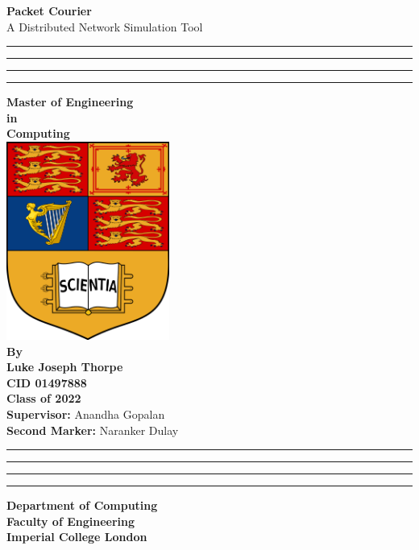 \thispagestyle{empty}
\begin{center}
    \textbf{\Huge Packet Courier}\\
    A Distributed Network Simulation Tool
    \vspace{1cm}
    \hrule\hrule\hrule\hrule
    \vspace{1cm}
    \textbf{Master of Engineering\\
    in\\
    Computing\\
    \vspace{1cm}
    \includegraphics[width=0.4\textwidth]{images/cover/icl_crest}
    \vspace{1cm}
    \\
    By\\
    Luke Joseph Thorpe\\
    CID 01497888\\
    Class of 2022}\\
    \vspace{0.5cm}
    \textbf{Supervisor:} Anandha Gopalan\\
    \textbf{Second Marker:} Naranker Dulay\\
    \vspace{1cm}
    \hrule\hrule\hrule\hrule
    \textbf{Department of Computing\\
    Faculty of Engineering\\
    Imperial College London}
\end{center}
\clearpage
